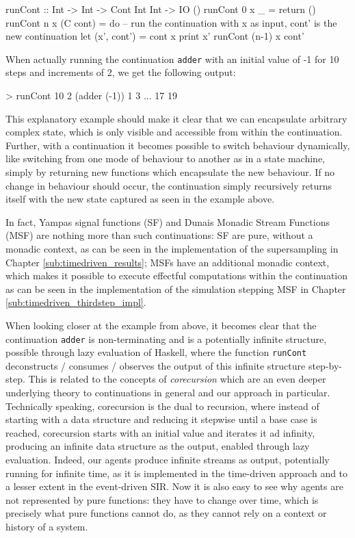 \begin{HaskellCode}
runCont :: Int -> Int -> Cont Int Int -> IO ()
runCont 0 x _ = return () 
runCont n x (C cont) = do 
  -- run the continuation with x as input, cont' is the new continuation
  let (x', cont') = cont x
  print x'
  runCont (n-1) x cont' 
\end{HaskellCode}

When actually running the continuation \texttt{adder} with an initial value of -1 for 10 steps and increments of 2, we get the following output:

\begin{HaskellCode}
> runCont 10 2 (adder (-1))
1
3
...
17
19
\end{HaskellCode}

This explanatory example should make it clear that we can encapsulate arbitrary complex state, which is only visible and accessible from within the continuation. Further, with a continuation it becomes possible to switch behaviour dynamically, like switching from one mode of behaviour to another as in a state machine, simply by returning new functions which encapsulate the new behaviour. If no change in behaviour should occur, the continuation simply recursively returns itself with the new state captured as seen in the example above.

In fact, Yampas signal functions (SF) and Dunais Monadic Stream Functions (MSF) are nothing more than such continuations: SF are pure, without a monadic context, as can be seen in the implementation of the supersampling in Chapter \ref{sub:timedriven_results}; MSFs have an additional monadic context, which makes it possible to execute effectful computations within the continuation as can be seen in the implementation of the simulation stepping MSF in Chapter \ref{sub:timedriven_thirdstep_impl}. 

\medskip

When looking closer at the example from above, it becomes clear that the continuation \texttt{adder} is non-terminating and is a potentially infinite structure, possible through lazy evaluation of Haskell, where the function \texttt{runCont} deconstructs / consumes / observes the output of this infinite structure step-by-step. This is related to the concepts of \textit{corecursion} which are an even deeper underlying theory to continuations in general and our approach in particular. Technically speaking, corecursion is the dual to recursion, where instead of starting with a data structure and reducing it stepwise until a base case is reached, corecursion starts with an initial value and iterates it ad infinity, producing an infinite data structure as the output, enabled through lazy evaluation. 
Indeed, our agents produce infinite streams as output, potentially running for infinite time, as it is implemented in the time-driven approach and to a lesser extent in the event-driven SIR. Now it is also easy to see why agents are not represented by pure functions: they have to change over time, which is precisely what pure functions cannot do, as they cannot rely on a context or history of a system.


